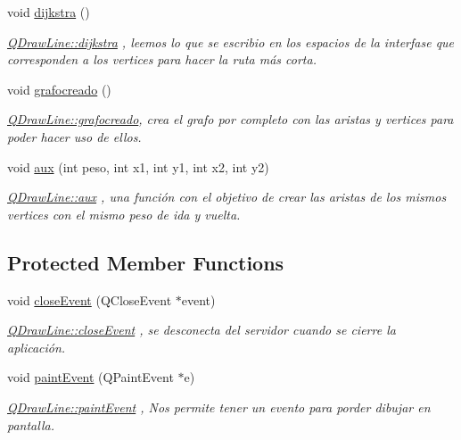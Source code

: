 \begin{DoxyCompactItemize}
\mbox{\label{class_q_draw_line_aeb3043ebed81cbb2814eeb8625616f42}} 
void \hyperlink{class_q_draw_line_aeb3043ebed81cbb2814eeb8625616f42}{dijkstra} ()
\begin{DoxyCompactList}\small\item\em \hyperlink{class_q_draw_line_aeb3043ebed81cbb2814eeb8625616f42}{Q\+Draw\+Line\+::dijkstra} , leemos lo que se escribio en los espacios de la interfase que corresponden a los vertices para hacer la ruta más corta. \end{DoxyCompactList}\item 
\mbox{\label{class_q_draw_line_ad83e23c31610b56b59072897607bcde3}} 
void \hyperlink{class_q_draw_line_ad83e23c31610b56b59072897607bcde3}{grafocreado} ()
\begin{DoxyCompactList}\small\item\em \hyperlink{class_q_draw_line_ad83e23c31610b56b59072897607bcde3}{Q\+Draw\+Line\+::grafocreado}, crea el grafo por completo con las aristas y vertices para poder hacer uso de ellos. \end{DoxyCompactList}\item 
void \hyperlink{class_q_draw_line_abb48f3a56434368ee258c56f4f15874e}{aux} (int peso, int x1, int y1, int x2, int y2)
\begin{DoxyCompactList}\small\item\em \hyperlink{class_q_draw_line_abb48f3a56434368ee258c56f4f15874e}{Q\+Draw\+Line\+::aux} , una función con el objetivo de crear las aristas de los mismos vertices con el mismo peso de ida y vuelta. \end{DoxyCompactList}\end{DoxyCompactItemize}
\subsection*{Protected Member Functions}
\begin{DoxyCompactItemize}
\item 
void \hyperlink{class_q_draw_line_a486e830084956f38a2da8bcc78ea9063}{close\+Event} (Q\+Close\+Event $\ast$event)
\begin{DoxyCompactList}\small\item\em \hyperlink{class_q_draw_line_a486e830084956f38a2da8bcc78ea9063}{Q\+Draw\+Line\+::close\+Event} , se desconecta del servidor cuando se cierre la aplicación. \end{DoxyCompactList}\item 
void \hyperlink{class_q_draw_line_ad2f14d95531049f1bf54474dbf60965b}{paint\+Event} (Q\+Paint\+Event $\ast$e)
\begin{DoxyCompactList}\small\item\em \hyperlink{class_q_draw_line_ad2f14d95531049f1bf54474dbf60965b}{Q\+Draw\+Line\+::paint\+Event} , Nos permite tener un evento para porder dibujar en pantalla. \end{DoxyCompactList}\end{DoxyCompactItemize}



